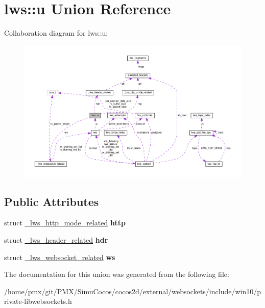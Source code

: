 \hypertarget{unionlws_1_1u}{}\section{lws\+:\+:u Union Reference}
\label{unionlws_1_1u}


Collaboration diagram for lws\+:\+:u\+:
\nopagebreak
\begin{figure}[H]
\begin{center}
\leavevmode
\includegraphics[width=350pt]{unionlws_1_1u__coll__graph}
\end{center}
\end{figure}
\subsection*{Public Attributes}
\begin{DoxyCompactItemize}
\item 
\mbox{\label{unionlws_1_1u_ab32d9cbd4bd9271a7ff75afda424412e}} 
struct \hyperlink{struct__lws__http__mode__related}{\+\_\+lws\+\_\+http\+\_\+mode\+\_\+related} {\bfseries http}
\item 
\mbox{\label{unionlws_1_1u_a9bd0a255a92cd84f77c9003e2e43b58f}} 
struct \hyperlink{struct__lws__header__related}{\+\_\+lws\+\_\+header\+\_\+related} {\bfseries hdr}
\item 
\mbox{\label{unionlws_1_1u_accba3d0f792e378b6538738e9644ea83}} 
struct \hyperlink{struct__lws__websocket__related}{\+\_\+lws\+\_\+websocket\+\_\+related} {\bfseries ws}
\end{DoxyCompactItemize}


The documentation for this union was generated from the following file\+:\begin{DoxyCompactItemize}
\item 
/home/pmx/git/\+P\+M\+X/\+Simu\+Cocos/cocos2d/external/websockets/include/win10/private-\/libwebsockets.\+h\end{DoxyCompactItemize}
